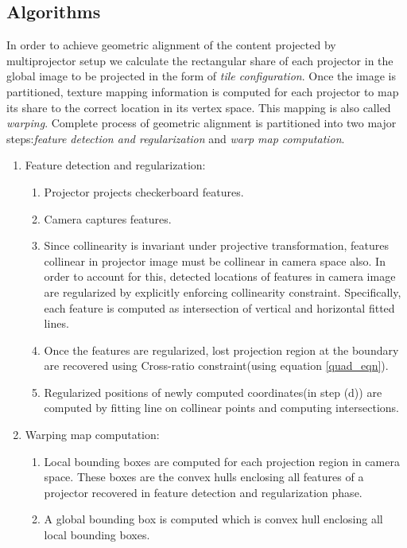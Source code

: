 \documentclass[conference]{/home/pranav/Desktop/Publication_work/latex_class_files/IEEEtran}
\begin{document}
\subsection{Algorithms}
In order to achieve geometric alignment of the content projected by multiprojector setup we calculate the rectangular share of each projector in the global image to be projected in the form of \textit{tile configuration}. Once the image is partitioned, texture mapping information is computed for each projector to map its share to the correct location in its vertex space. This mapping is also called \textit{warping}. Complete process of geometric alignment is partitioned into two major steps:\textit{feature detection and regularization} and \textit{warp map computation}.   
\begin{enumerate}    
\item Feature detection and regularization:
\begin{enumerate}
\item Projector projects checkerboard features.
\item Camera captures features.
\item Since collinearity is invariant under projective transformation, features collinear in projector image must be 		      collinear in camera space also. In order to account for this, detected locations of features in camera image are regularized by explicitly enforcing collinearity constraint. Specifically, each feature is computed as intersection of vertical and horizontal fitted lines.

\item Once the features are regularized, lost projection region at the boundary are recovered using Cross-ratio constraint(using equation \ref{quad_eqn}).
\item Regularized positions of newly computed coordinates(in step (d)) are computed by fitting line on collinear points and computing intersections.\newline
\end{enumerate}
\item Warping map computation:
\begin{enumerate}	     
\item Local bounding boxes are computed for each projection region in camera space. These boxes are the convex hulls enclosing all features of a projector recovered in feature detection and regularization phase.

\item A global bounding box is computed which is convex hull enclosing all local bounding boxes.


\end{enumerate}
\end{enumerate}
\end{document}
